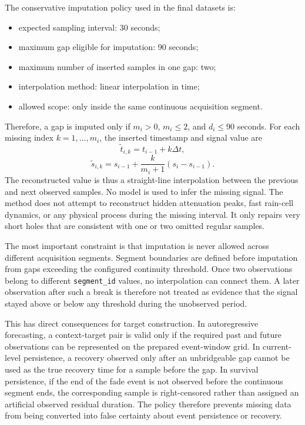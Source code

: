 The conservative imputation policy used in the final datasets is:

\begin{itemize}
  \item expected sampling interval: 30 seconds;
  \item maximum gap eligible for imputation: 90 seconds;
  \item maximum number of inserted samples in one gap: two;
  \item interpolation method: linear interpolation in time;
  \item allowed scope: only inside the same continuous acquisition segment.
\end{itemize}

Therefore, a gap is imputed only if \(m_i > 0\), \(m_i \leq 2\), and
\(d_i \leq 90\) seconds. For each missing index \(k=1,\ldots,m_i\), the
inserted timestamp and signal value are
\[
  \tilde{t}_{i,k} = t_{i-1} + k\Delta t,
\]
\[
  \tilde{s}_{i,k}
  =
  s_{i-1}
  +
  \frac{k}{m_i+1}
  (s_i - s_{i-1}).
\]
The reconstructed value is thus a straight-line interpolation between the
previous and next observed samples. No model is used to infer the missing
signal. The method does not attempt to reconstruct hidden attenuation peaks,
fast rain-cell dynamics, or any physical process during the missing interval.
It only repairs very short holes that are consistent with one or two omitted
regular samples.

The most important constraint is that imputation is never allowed across
different acquisition segments. Segment boundaries are defined before
imputation from gaps exceeding the configured continuity threshold. Once two
observations belong to different \texttt{segment\_id} values, no interpolation
can connect them. A later observation after such a break is therefore not
treated as evidence that the signal stayed above or below any threshold during
the unobserved period.

This has direct consequences for target construction. In autoregressive
forecasting, a context-target pair is valid only if the required past and
future observations can be represented on the prepared event-window grid. In
current-level persistence, a recovery observed only after an unbridgeable gap
cannot be used as the true recovery time for a sample before the gap. In
survival persistence, if the end of the fade event is not observed before the
continuous segment ends, the corresponding sample is right-censored rather
than assigned an artificial observed residual duration. The policy therefore
prevents missing data from being converted into false certainty about event
persistence or recovery.

